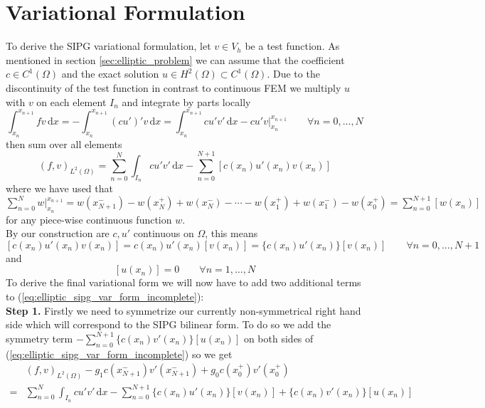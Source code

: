 \section{Variational Formulation}
\label{sec:elliptic_var_form}
To derive the SIPG variational formulation, let $v \in V_h$ be a test
function. As mentioned in section \ref{sec:elliptic_problem} we can assume that the coefficient $c \in C^1(\Omega)$ and
the exact solution $u \in H^2(\Omega) \subset C^1(\Omega)$.
Due to the discontinuity of the test function in contrast to
continuous FEM we multiply $u$ with $v$ on each element $I_n$
and integrate by parts locally
\begin{equation*}
	\int_{x_n}^{x_{n+1}} fv\, \text{d}x = -\int_{x_n}^{x_{n+1}} (cu')'v\, \text{d}x
	= \int_{x_n}^{x_{n+1}} cu'v'\, \text{d}x
	-  cu'v\Big|_{x_n}^{x_{n+1}} \qquad \forall n=0,\ldots,N
\end{equation*}
then sum over all elements
\begin{equation}
	\label{eq:elliptic_sipg_var_form_incomplete}
	(f,v)_{L^2(\Omega)} = \sum_{n=0}^N \int_{I_n} cu'v'\, \text{d}x
	-\sum_{n=0}^{N+1} [c(x_n)u'(x_n)v(x_n)]
\end{equation}
where we have used that $\sum_{n=0}^N  w \Big|_{x_n}^{x_{n+1}} = w(x_{N+1}^-) -
	w(x_{N}^+) + w(x_{N}^-) - \cdots - w(x_1^+) + w(x_1^-) - w(x_0^+) = \sum_{n=0}^{N+1} [w(x_n)]$ for any piece-wise continuous function $w$.
\\
By our construction are $c, u'$ continuous on $\Omega$, this means
\begin{equation}
	\label{eq:id_1_cu_jump_zero}
	[c(x_n)u'(x_n)v(x_n)] = c(x_n)u'(x_n)[v(x_n)] = \{c(x_n)u'(x_n)\}[v(x_n)] \qquad \forall n=0,\ldots,N+1
\end{equation}
and
\begin{equation}
	\label{eq:id_2_u_jump_zero}
	[u(x_n)] = 0 \qquad \forall n=1,\ldots,N
\end{equation}
To derive the final variational form we will now have to add two additional terms
to (\ref{eq:elliptic_sipg_var_form_incomplete}): \\
\textbf{Step 1.} Firstly we need to symmetrize our currently non-symmetrical right hand side
which will correspond to the SIPG bilinear form. To do so
we add the symmetry term $-\sum_{n=0}^{N+1} \{c(x_n)v'(x_n)\}[u(x_n)]$ on both sides of
(\ref{eq:elliptic_sipg_var_form_incomplete}) so we get
\begin{align*}
	  & (f,v)_{L^2(\Omega)}-g_1c(x_{N+1}^-)v'(x_{N+1}^-) + g_0c(x_0^+)v'(x_0^+) \\
	= & \sum_{n=0}^N \int_{I_n} cu'v'\, \text{d}x
	-\sum_{n=0}^{N+1} \{c(x_n)u'(x_n)\}[v(x_n)] + \{c(x_n)v'(x_n)\}[u(x_n)]
\end{align*}
